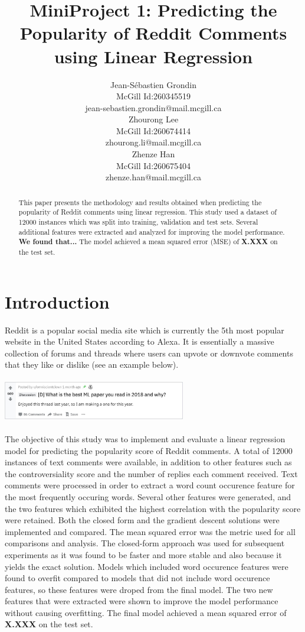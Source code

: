 \documentclass[11pt]{article}
\title{MiniProject 1: Predicting the Popularity of Reddit Comments using Linear Regression}
\author{%
\begin{tabular}{c} Jean-Sébastien Grondin \\ \normalfont McGill Id:260345519  \\ \normalfont \small jean-sebastien.grondin@mail.mcgill.ca \end{tabular} 
\begin{tabular}{c} Zhourong Lee \\ \normalfont McGill Id:260674414  \\ \normalfont \small zhourong.li@mail.mcgill.ca \end{tabular} 
\begin{tabular}{c} Zhenze Han \\ \normalfont McGill Id:260675404  \\ \normalfont \small zhenze.han@mail.mcgill.ca \end{tabular} }
\begin{document}
\maketitle

\begin{abstract}
This paper presents the methodology and results obtained when predicting the popularity of Reddit comments using linear regression. This study used a dataset of 12000 instances which was split into training, validation and test sets.  Several additional features were extracted and analyzed for improving the model performance. \textbf{We found that...} The model achieved a mean squared error (MSE) of  \textbf{X.XXX} on the test set. 
\end{abstract}

\section{Introduction}
Reddit is a popular social media site which is currently the 5th most popular website in the United States according to Alexa. It is essentially a massive collection of forums and threads where users can upvote or downvote comments that they like or dislike (see an example below).\\
\\
\includegraphics[width=8cm]{reddit}\\
\\
The objective of this study was to implement and evaluate a linear regression model for predicting the popularity score of Reddit comments. A total of 12000 instances of text comments were available, in addition to other features such as the controversiality score and the number of replies each comment received. Text comments were processed in order to extract a word count occurence feature for the most frequently occuring words. Several other features were generated, and the two features which exhibited the highest correlation with the popularity score were retained. Both the closed form and the gradient descent solutions were implemented and compared. The mean squared error was the metric used for all comparisons and analysis. The closed-form approach was used for subsequent experiments as it was found to be faster and more stable and also because it yields the exact solution. Models which included word occurence features were found to overfit compared to models that did not include word occurence features, so these features were droped from the final model. The two new features that were extracted were shown to improve the model performance without causing overfitting. The final model achieved a mean squared error of \textbf{X.XXX} on the test set. 
\end{document}
